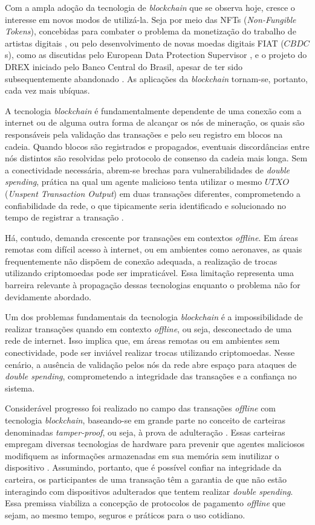 \documentclass[
  12pt,
  a4paper,
  oneside,
  article,
]{abntex2}
\begin{document}
Com a ampla adoção da tecnologia de \textit{blockchain} que se observa hoje, cresce o interesse em novos modos de utilizá-la. Seja por meio das NFTs (\textit{Non-Fungible Tokens}), concebidas para combater o problema da monetização do trabalho de artistas digitais \cite{nfts}, ou pelo desenvolvimento de novas moedas digitais FIAT ($CBDC$s), como as discutidas pelo European Data Protection Supervisor \cite{edps}, e o projeto do DREX iniciado pelo Banco Central do Brasil, apesar de ter sido subsequentemente abandonado \cite{drexabandonado}. As aplicações da \textit{blockchain} tornam-se, portanto, cada vez mais ubíquas.

A tecnologia \textit{blockchain} é fundamentalmente dependente de uma conexão com a internet ou de alguma outra forma de alcançar os nós de mineração, os quais são responsáveis pela validação das transações e pelo seu registro em blocos na cadeia. Quando blocos são registrados e propagados, eventuais discordâncias entre nós distintos são resolvidas pelo protocolo de consenso da cadeia mais longa. Sem a conectividade necessária, abrem-se brechas para vulnerabilidades de \textit{double spending}, prática na qual um agente malicioso tenta utilizar o mesmo $UTXO$ (\textit{Unspent Transaction Output}) em duas transações diferentes, comprometendo a confiabilidade da rede, o que tipicamente seria identificado e solucionado no tempo de registrar a transação \cite{nakamoto2008}.

Há, contudo, demanda crescente por transações em contextos \textit{offline}. Em áreas remotas com difícil acesso à internet, ou em ambientes como aeronaves, as quais frequentemente não dispõem de conexão adequada, a realização de trocas utilizando criptomoedas pode ser impraticável. Essa limitação representa uma barreira relevante à propagação dessas tecnologias enquanto o problema não for devidamente abordado.

Um dos problemas fundamentais da tecnologia \textit{blockchain} é a impossibilidade de realizar transações quando em contexto \textit{offline}, ou seja, desconectado de uma rede de internet. Isso implica que, em áreas remotas ou em ambientes sem conectividade, pode ser inviável realizar trocas utilizando criptomoedas. Nesse cenário, a ausência de validação pelos nós da rede abre espaço para ataques de \textit{double spending}, comprometendo a integridade das transações e a confiança no sistema.

Considerável progresso foi realizado no campo das transações \textit{offline} com tecnologia \textit{blockchain}, baseando-se em grande parte no conceito de carteiras denominadas \textit{tamper-proof}, ou seja, à prova de adulteração \cite{dmitrienko2017}. Essas carteiras empregam diversas tecnologias de hardware para prevenir que agentes maliciosos modifiquem as informações armazenadas em sua memória sem inutilizar o dispositivo \cite{jie2024}. Assumindo, portanto, que é possível confiar na integridade da carteira, os participantes de uma transação têm a garantia de que não estão interagindo com dispositivos adulterados que tentem realizar \textit{double spending}. Essa premissa viabiliza a concepção de protocolos de pagamento \textit{offline} que sejam, ao mesmo tempo, seguros e práticos para o uso cotidiano.
\end{document}
